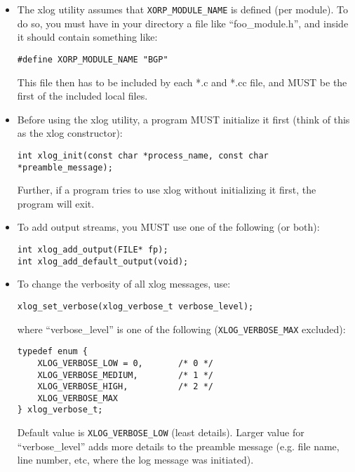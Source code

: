 \documentclass[11pt]{article}
\begin{document}
\begin{itemize}

  \item The xlog utility assumes that \verb=XORP_MODULE_NAME= is defined
   (per module). To do so, you must have in your directory a file like
   ``foo\_module.h'', and inside it should contain something like:

\begin{verbatim}
#define XORP_MODULE_NAME "BGP"
\end{verbatim}

   This file then has to be included by each *.c and *.cc file,
   and MUST be the first of the included local files.

  \item Before using the xlog utility, a program MUST initialize it
   first (think of this as the xlog constructor):

\begin{verbatim}
int xlog_init(const char *process_name, const char *preamble_message);
\end{verbatim}
	
   Further, if a program tries to use xlog without initializing it
   first, the program will exit.

  \item To add output streams, you MUST use one of the following (or both):

\begin{verbatim}
int xlog_add_output(FILE* fp);
int xlog_add_default_output(void);
\end{verbatim}
	
  \item To change the verbosity of all xlog messages, use:

\begin{verbatim}
xlog_set_verbose(xlog_verbose_t verbose_level);
\end{verbatim}

   where ``verbose\_level'' is one of the following (\verb=XLOG_VERBOSE_MAX=
   excluded):

\begin{verbatim}
typedef enum {
    XLOG_VERBOSE_LOW = 0,       /* 0 */
    XLOG_VERBOSE_MEDIUM,        /* 1 */
    XLOG_VERBOSE_HIGH,          /* 2 */
    XLOG_VERBOSE_MAX
} xlog_verbose_t;
\end{verbatim}

   Default value is \verb=XLOG_VERBOSE_LOW= (least details).
   Larger value for ``verbose\_level'' adds more details to the
   preamble message (e.g. file name, line number, etc, where
   the log message was initiated).


\end{itemize}
\end{document}
